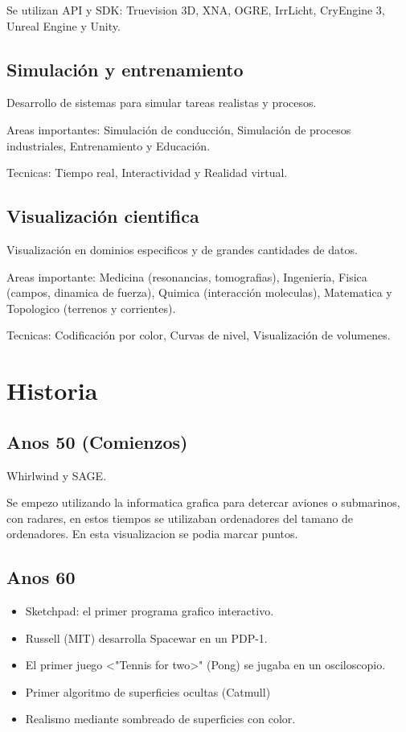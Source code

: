 \documentclass[12pt, twoside, openright]{report} %
\begin{document}
Se utilizan API y SDK: Truevision 3D, XNA, OGRE, IrrLicht, CryEngine 3, Unreal Engine y Unity.

\subsection{Simulación y entrenamiento}
Desarrollo de sistemas para simular tareas realistas y procesos.

Areas importantes: Simulación de conducción, Simulación de procesos industriales, Entrenamiento y Educación.

Tecnicas: Tiempo real, Interactividad y Realidad virtual.

\subsection{Visualización cientifica}
Visualización en dominios especificos y de grandes cantidades de datos.

Areas importante: Medicina (resonancias, tomografias), Ingenieria, Fisica (campos, dinamica de fuerza), Quimica (interacción moleculas), Matematica y Topologico (terrenos y corrientes).

Tecnicas: Codificación por color, Curvas de nivel, Visualización de volumenes.

\section{Historia}
\subsection{Anos 50 (Comienzos)}
Whirlwind y SAGE.

Se empezo utilizando la informatica grafica para detercar aviones o submarinos, con radares, en estos tiempos se utilizaban ordenadores del tamano de ordenadores. En esta visualizacion se podia marcar puntos.

\subsection{Anos 60}
\begin{itemize}
  \item Sketchpad: el primer programa grafico interactivo.
  \item Russell (MIT) desarrolla Spacewar en un PDP-1.
  \item El primer juego <"Tennis for two>" (Pong) se jugaba en un osciloscopio.
  \item Primer algoritmo de superficies ocultas (Catmull)
  \item Realismo mediante sombreado de superficies con color.
\end{itemize}
\end{document}
